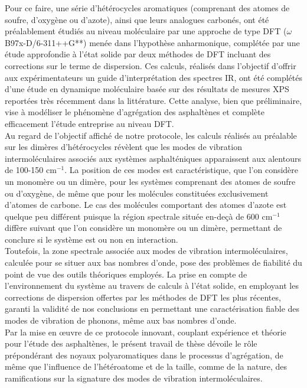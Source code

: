 	Pour ce faire, une série d’hétérocycles aromatiques (comprenant des atomes de soufre, d’oxygène ou d’azote), ainsi que leurs analogues carbonés, ont été préalablement étudiés au niveau moléculaire par une approche de type DFT ($\omega$B97x-D/6-311++G**) menée dans l’hypothèse anharmonique, complétée par une étude approfondie à l’état solide par deux méthodes de DFT incluant des corrections sur le terme de dispersion. Ces calculs, réalisés dans l’objectif d’offrir aux expérimentateurs un guide d’interprétation des spectres IR, ont été complétés d’une étude en dynamique moléculaire basée sur des résultats de mesures XPS reportées très récemment dans la littérature. Cette analyse, bien que préliminaire, vise à modéliser le phénomène d’agrégation des asphaltènes et complète efficacement l’étude entreprise au niveau DFT.\\
	 
	Au regard de l’objectif affiché de notre protocole, les calculs réalisés au préalable sur les dimères d’hétérocycles révèlent que les modes de vibration intermoléculaires associés aux systèmes asphalténiques apparaissent aux alentours de 100-150 cm$^{-1}$. La position de ces modes est caractéristique, que l’on considère un monomère ou un dimère, pour les systèmes comprenant des atomes de soufre ou d’oxygène, de même que pour les molécules constituées exclusivement d’atomes de carbone. Le cas des molécules comportant des atomes d’azote est quelque peu différent puisque la région spectrale située en-deçà de 600 cm$^{-1}$ diffère suivant que l’on considère un monomère ou un dimère, permettant de conclure si le système est ou non en interaction.\\
	 
	Toutefois, la zone spectrale associée aux modes de vibration intermoléculaires, calculée pour se situer aux bas nombres d’onde, pose des problèmes de fiabilité du point de vue des outils théoriques employés. La prise en compte de l’environnement du système au travers de calculs à l’état solide, en employant les corrections de dispersion offertes par les méthodes de DFT les plus récentes, garanti la validité de nos conclusions en permettant une caractérisation fiable des modes de vibration de phonons, même aux bas nombres d’onde.\\ 
	
	Par la mise en œuvre de ce protocole innovant, couplant expérience et théorie pour l’étude des asphaltènes, le présent travail de thèse dévoile le rôle prépondérant des noyaux polyaromatiques dans le processus d’agrégation, de même que l’influence de l’hétéroatome et de la taille, comme de la nature, des ramifications sur la signature des modes de vibration intermoléculaires. 